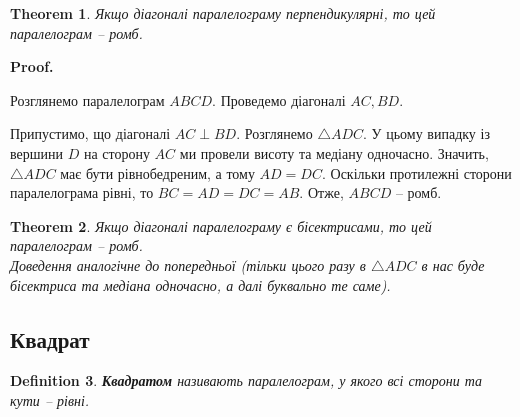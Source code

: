 \documentclass[a4paper, 10pt]{article}
\makeatletter
\def\qed{$\blacksquare$}
\theoremstyle{theoremdd}
\newtheorem{theorem}{Theorem}[subsection]
\theoremstyle{theoremdd}
\theoremstyle{theoremdd}
\newtheorem{definition}[theorem]{Definition}
\theoremstyle{theoremdd}
\theoremstyle{theoremdd}
\theoremstyle{theoremdd}
\theoremstyle{theoremdd}
\theoremstyle{theoremdd}
\theoremstyle{theoremdd}
\renewenvironment{proof}[1][Proof.\\]{\par
\pushQED{\hfill \qed}%
\normalfont \topsep6\p@\@plus6\p@\relax
\trivlist
\item\relax
{\bfseries
#1\@addpunct{.}}\hspace\labelsep\ignorespaces
}{%
\popQED\endtrivlist\@endpefalse
}
\makeatother
\begin{document}
\begin{theorem}
Якщо діагоналі паралелограму перпендикулярні, то цей паралелограм -- ромб.
\end{theorem}

\begin{proof}
Розглянемо паралелограм $ABCD$. Проведемо діагоналі $AC,BD$.
\begin{figure}[H]
\centering
{}
\end{figure}
Припустимо, що діагоналі $AC \perp BD$. Розглянемо $\triangle ADC$. У цьому випадку із вершини $D$ на сторону $AC$ ми провели висоту та медіану одночасно. Значить, $\triangle ADC$ має бути рівнобедреним, а тому $AD = DC$. Оскільки протилежні сторони паралелограма рівні, то $BC = AD = DC = AB$. Отже, $ABCD$ -- ромб.
\end{proof}

\begin{theorem}
Якщо діагоналі паралелограму є бісектрисами, то цей паралелограм -- ромб.\\
\textit{Доведення аналогічне до попередньої (тільки цього разу в $\triangle ADC$ в нас буде бісектриса та медіана одночасно, а далі буквально те саме).}
\end{theorem}

\subsection{Квадрат}
\begin{definition}
\textbf{Квадратом} називають паралелограм, у якого всі сторони та кути -- рівні.
\begin{figure}[H]
\centering
{}
\end{figure}
\end{definition}
\end{document}
